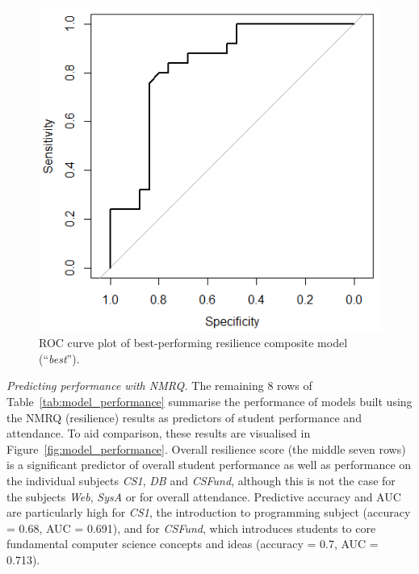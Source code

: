 \documentclass[sigconf]{acmart}
\begin{document}
\begin{figure} [h]
\centering
\includegraphics[width=.9\linewidth]{images/ROC_best_model.png}
\caption{ROC curve plot of best-performing resilience composite model (``{\em best}'').}
\label{fig:roc_curve} 
\end{figure}

{\em Predicting performance with NMRQ.}
The remaining 8 rows of Table~\ref{tab:model_performance} summarise the performance of models built using the NMRQ (resilience) results as predictors of student performance and attendance. To aid comparison, these results are visualised in Figure~\ref{fig:model_performance}. Overall resilience score (the middle seven rows) is a significant predictor of overall student performance as well as performance on the individual subjects {\em CS1}, {\em DB} and {\em CSFund}, although this is not the case for the subjects {\em Web}, {\em SysA} or for overall attendance. Predictive accuracy and AUC are particularly high for {\em CS1}, the introduction to programming subject (accuracy = 0.68, AUC = 0.691), and for {\em CSFund}, which introduces students to core fundamental computer science concepts and ideas (accuracy = 0.7, AUC = 0.713).
\end{document}
